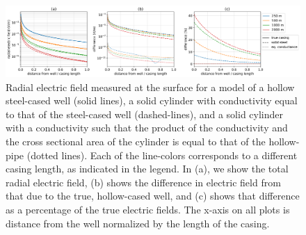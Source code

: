 \begin{figure}
    \begin{center}
    \includegraphics[width=\textwidth]{figures/dc_casing/approximating_wells_electric_fields.png}
    \end{center}
\caption{
    Radial electric field measured at the surface for a model of
    a hollow steel-cased well (solid lines), a solid cylinder with
    conductivity equal to that of the steel-cased well (dashed-lines),
    and a solid cylinder with a conductivity such that the product of the
    conductivity and the cross sectional area of the cylinder is equal to that
    of the hollow-pipe (dotted lines). Each of the line-colors corresponds to a
    different casing length, as indicated in the legend.
    In (a), we show the total radial electric field,
    (b) shows the difference in electric field from that due to the true, hollow-cased well,
    and (c) shows that difference as a percentage
    of the true electric fields.
    The x-axis on all plots is distance from the well normalized by the length of the casing.
}
\label{fig:approximating_wells_electric_fields}
\end{figure}
